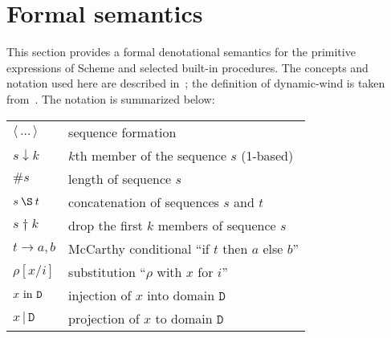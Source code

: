 
\section{Formal semantics}
\label{formalsemanticssection}

\bgroup

\newcommand{\sembrack}[1]{[\![#1]\!]}
\newcommand{\fun}[1]{\hbox{\it #1}}
\newenvironment{semfun}{\begin{tabbing}$}{$\end{tabbing}}
\newcommand\LOC{{\tt{}L}}
\newcommand\NAT{{\tt{}N}}
\newcommand\TRU{{\tt{}T}}
\newcommand\SYM{{\tt{}Q}}
\newcommand\CHR{{\tt{}H}}
\newcommand\NUM{{\tt{}R}}
\newcommand\FUN{{\tt{}F}}
\newcommand\EXP{{\tt{}E}}
\newcommand\STV{{\tt{}E}}
\newcommand\STO{{\tt{}S}}
\newcommand\ENV{{\tt{}U}}
\newcommand\ANS{{\tt{}A}}
\newcommand\ERR{{\tt{}X}}
\newcommand\DP{\tt{P}}
\newcommand\EC{{\tt{}K}}
\newcommand\CC{{\tt{}C}}
\newcommand\MSC{{\tt{}M}}
\newcommand\PAI{\hbox{\EXP$_{\rm p}$}}
\newcommand\VEC{\hbox{\EXP$_{\rm v}$}}
\newcommand\STR{\hbox{\EXP$_{\rm s}$}}

\newcommand\elt{\downarrow}
\newcommand\drop{\dagger}

\newcommand{\wrong}[1]{\fun{wrong }\hbox{\rm``#1''}}
\newcommand{\go}[1]{\hbox{\hspace*{#1em}}}

This section provides a formal denotational semantics for the primitive
expressions of Scheme and selected built-in procedures.  The concepts
and notation used here are described in~\cite{Stoy77}; the definition of
{\cf dynamic-wind} is taken from~\cite{GasbichlerKnauelSperberKelsey2003}.
The notation is summarized below:

\begin{tabular}{ll}
$\langle\,\ldots\,\rangle$ & sequence formation \\
$s \elt k$                 & $k$th member of the sequence $s$ (1-based) \\
$\#s$                      & length of sequence $s$ \\
$s \:\S\: t$               & concatenation of sequences $s$ and $t$ \\
$s \drop k$                & drop the first $k$ members of sequence $s$ \\
$t \rightarrow a, b$       & McCarthy conditional ``if $t$ then $a$ else $b$'' \\
$\rho[x/i]$                & substitution ``$\rho$ with $x$ for $i$'' \\
$x\hbox{ \rm in }{\texttt{D}}$         & injection of $x$ into domain $\texttt{D}$ \\
$x\,\vert\,\texttt{D}$       & projection of $x$ to domain $\texttt{D}$
\end{tabular}

